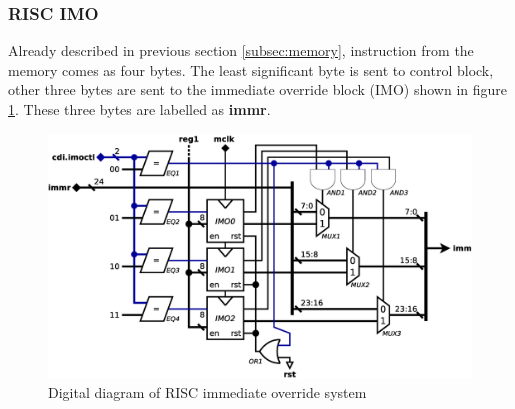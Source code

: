 \subsubsection{RISC IMO} \label{subsec:imo}
Already described in previous section \ref{subsec:memory}, instruction from the memory comes as four bytes. The least significant byte is sent to control block, other three bytes are sent to the immediate override block (IMO) shown in figure \ref{fig:risc_imo}. These three bytes are labelled as \textbf{immr}. 

\begin{figure}
	\centering
	\includegraphics[scale=0.4]{../resources/risc_imo.eps}
	\caption{Digital diagram of RISC immediate override system}
	\label{fig:risc_imo}
\end{figure}


